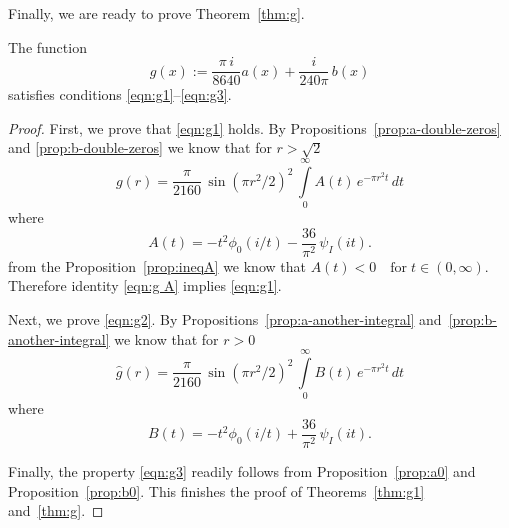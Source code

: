 Finally, we are ready to prove Theorem~\ref{thm:g}.
\begin{theorem}\label{thm:g1}
The function
$$g(x):=\frac{\pi\,i}{8640}a(x)+\frac{i}{240\pi}\,b(x)$$
satisfies conditions \eqref{eqn:g1}--\eqref{eqn:g3}.
\end{theorem}
\begin{proof}
First, we prove that \eqref{eqn:g1} holds. By Propositions~\ref{prop:a-double-zeros} and \ref{prop:b-double-zeros} we know that for $r>\sqrt{2}$
\begin{equation}\label{eqn:g A} g(r)=\frac{\pi}{2160}\,\sin(\pi r^2/2)^2\,\int\limits_0^\infty A(t)\,e^{-\pi r^2 t}\,dt\end{equation}
where $$A(t)=-t^2\phi_0(i/t)-\frac{36}{\pi^2}\,\psi_I(it).$$
from the Proposition~\ref{prop:ineqA} we know that $A(t)<0\quad\mbox{for}\;t\in(0,\infty).$
Therefore identity \eqref{eqn:g A} implies \eqref{eqn:g1}.

Next, we prove \eqref{eqn:g2}. By Propositions~\ref{prop:a-another-integral} and~\ref{prop:b-another-integral} we know that for $r>0$
\begin{equation}\label{eqn:g B} \widehat{g}(r)=\frac{\pi}{2160}\,\sin(\pi r^2/2)^2\,\int\limits_0^\infty B(t)\,e^{-\pi r^2 t}\,dt\end{equation}
where $$B(t)=-t^2\phi_0(i/t)+\frac{36}{\pi^2}\,\psi_I(it).$$


Finally, the property \eqref{eqn:g3} readily follows from Proposition~\ref{prop:a0} and Proposition~\ref{prop:b0}.
This finishes the proof of Theorems~\ref{thm:g1} and~\ref{thm:g}.
\end{proof}
